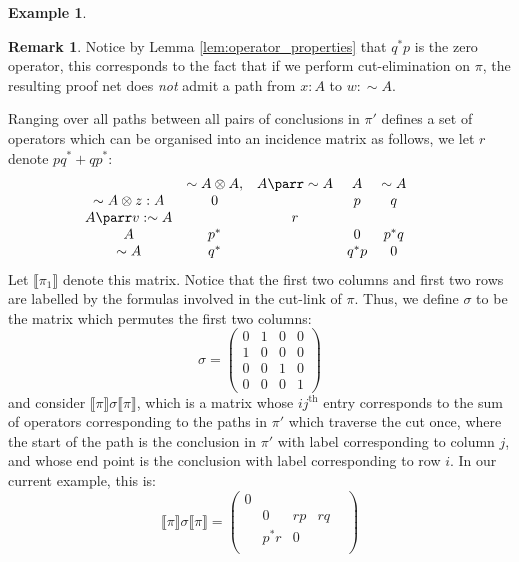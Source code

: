 \documentclass[12pt]{article}
\theoremstyle{plain}
\theoremstyle{definition}
\newtheorem{remark}[thm]{Remark}
\newtheorem{example}[thm]{Example}
\newcommand{\negation}{\sim}
\begin{document}
\begin{example}
		\begin{remark}
			Notice by Lemma \ref{lem:operator_properties} that $q^\ast p$ is the zero operator, this corresponds to the fact that if we perform cut-elimination on $\pi$, the resulting proof net does \emph{not} admit a path from $x:A$ to $w:\negation A$.
		\end{remark}
		Ranging over all paths between all pairs of conclusions in $\pi'$ defines a set of operators which can be organised into an incidence matrix as follows, we let $r$ denote $pq^\ast + qp^\ast$:
		\begin{equation}
			\begin{matrix}
				& \negation A \otimes A, & A \parr \negation A & A &  \negation A \\
				\negation A \otimes z: A &0&&p&q&&\\
				A \parr v: \negation A &&r&\\
				A &p^\ast&&0& p^\ast q&&\\
				\negation A &q^\ast&& q^\ast p&0
			\end{matrix}
		\end{equation}
		Let $\llbracket \pi_1 \rrbracket$ denote this matrix. Notice that the first two columns and first two rows are labelled by the formulas involved in the cut-link of $\pi$. Thus, we define $\sigma$ to be the matrix which permutes the first two columns:
		\begin{equation}
			\sigma =
			\begin{pmatrix}
				0 & 1 & 0 & 0\\
				1 & 0 & 0 & 0\\
				0 & 0 & 1 & 0\\
				0 & 0 & 0 & 1
			\end{pmatrix}
		\end{equation}
		and consider $\llbracket \pi \rrbracket \sigma \llbracket \pi \rrbracket$, which is a matrix whose $ij^{\text{th}}$ entry corresponds to the sum of operators corresponding to the paths in $\pi'$ which traverse the cut once, where the start of the path is the conclusion in $\pi'$ with label corresponding to column $j$, and whose end point is the conclusion with label corresponding to row $i$. In our current example, this is:
		\begin{equation}
			\llbracket \pi \rrbracket \sigma \llbracket \pi \rrbracket =
			\begin{pmatrix}
				0&&&\\
				&0&r p &r q &\\
				& p^\ast r &0&\\

\end{pmatrix}
\end{equation}
\end{example}
\end{document}
